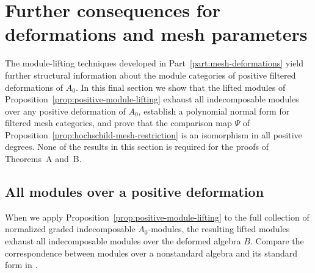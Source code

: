 \section{Further consequences for deformations and mesh parameters}
\label{sec:deformation-refinements}

The module-lifting techniques developed in Part~\ref{part:mesh-deformations} yield further structural information about the module categories of positive filtered deformations of $A_0$. In this final section we show that the lifted modules of Proposition~\ref{prop:positive-module-lifting} exhaust all indecomposable modules over any positive deformation of $A_0$, establish a polynomial normal form for filtered mesh categories, and prove that the comparison map $\Psi$ of Proposition~\ref{prop:hochschild-mesh-restriction} is an isomorphism in all positive degrees. None of the results in this section is required for the proofs of Theorems~A and~B.

\subsection{All modules over a positive deformation}

When we apply Proposition~\ref{prop:positive-module-lifting} to the full collection of normalized graded indecomposable $A_0$-modules, the resulting lifted modules exhaust all indecomposable modules over the deformed algebra $B$. Compare the correspondence between modules over a nonstandard algebra and its standard form in \cite[Theorem~1.9 and Remark~1.10]{BautistaSalmeron}.

